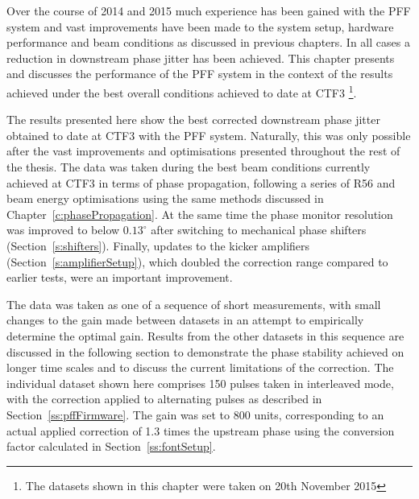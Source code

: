 
Over the course of 2014 and 2015 much experience has been gained with the PFF system and vast improvements have been made to the system setup, hardware performance and beam conditions as discussed in previous chapters. In all cases a reduction in downstream phase jitter has been achieved. This chapter presents and discusses the performance of the PFF system in the context of the results achieved under the best overall conditions achieved to date at CTF3 \footnote{The datasets shown in this chapter were taken on 20th November 2015}.




The results presented here show the best corrected downstream phase jitter obtained to date at CTF3 with the PFF system. Naturally, this was only possible after the vast improvements and optimisations presented throughout the rest of the thesis. The data was taken during the best beam conditions currently achieved at CTF3 in terms of phase propagation, following a series of R56 and beam energy optimisations using the same methods discussed in Chapter~\ref{c:phasePropagation}. %
At the same time the phase monitor resolution was improved to below \(0.13^\circ\) after switching to mechanical phase shifters (Section~\ref{s:shifters}). Finally, updates to the kicker amplifiers (Section~\ref{s:amplifierSetup}), which doubled the correction range compared to earlier tests, were an important improvement.

The data was taken as one of a sequence of short measurements, with small changes to the gain made between datasets in an attempt to empirically determine the optimal gain. Results from the other datasets in this sequence are discussed in the following section to demonstrate the phase stability achieved on longer time scales and to discuss the current limitations of the correction. The individual dataset shown here comprises 150 pulses taken in interleaved mode, with the correction applied to alternating pulses as described in Section~\ref{ss:pffFirmware}. The gain was set to 800 units, corresponding to an actual applied correction of 1.3 times the upstream phase using the conversion factor calculated in Section~\ref{ss:fontSetup}.

